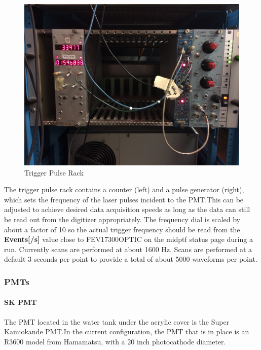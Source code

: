 \documentclass[twoside,letterpaper]{refart}
\newcommand{\picwidth}{0.7 \textwidth}
\begin{document}
\begin{figure}[!htpb]\centering
	\includegraphics[width=\picwidth]{images/nimCrate}
	\caption{Trigger Pulse Rack\label{vme}}
\end{figure}

\FloatBarrier

The trigger pulse rack contains a counter (left) and a pulse generator (right), which sets the frequency of the laser pulses incident to the PMT.\@ This can be adjusted to achieve desired data acquisition speeds as long as the data can still be read out from the digitizer appropriately. The frequency dial is scaled by about a factor of 10 so the actual trigger frequency should be read from the \textbf{Events[/s]} value close to FEV17300OPTIC on the midptf status page during a run. Currently scans are performed at about 1600 Hz. Scans are performed at a default 3 seconds per point to provide a total of about 5000 waveforms per point.

\clearpage

\subsubsection{PMTs}

\paragraph{SK PMT}

The PMT located in the water tank under the acrylic cover is the Super Kamiokande PMT.\@ In the current configuration, the PMT that is in place is an R3600 model from Hamamatsu, with a 20 inch photocathode diameter.
\end{document}

